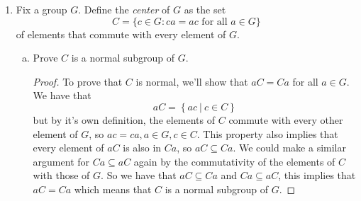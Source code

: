 \documentclass{article}
\newcommand{\parens}[1]{\left(#1\right)}
\newcommand{\bracks}[1]{\left\{#1\right\}}
\begin{document}
\begin{enumerate}[(H1)]
\begin{proof}
To prove that $A_n$ is a normal subgroup, we'll use the test for
normality. The test for normality is 
$$A_n \text{ is normal if and only if }\tau A_n\tau^{-1} \subseteq 
A_n,\ \forall \tau \in S_n$$
To show that $\tau A_n\tau^{-1} \subseteq A_n$, we need only show 
that all permutations in $\tau A_n\tau^{-1}$ are even.
We know that 
for all $\tau \in S_n$ there exists $\tau^{-1} \in S_n$ such that
$$\tau\tau^{-1} = \tau^{-1}\tau = e$$
where $e$ is the identity element of $S_n$. The identity is an even
permutation in $S_n$ so this implies that the parities of $\tau$ and 
$\tau^{-1}$ are identical, because otherwise their composition would
result in an odd permutation. By it's own definition 
$$\tau A_n\tau^{-1} = \bracks{\tau a\tau^{-1}\ \big|\ a\in A_n}$$
and as all permutations in $A_n$ are even, we need only consider the
parity of $\tau$.
If $\tau$ is even, 
$\tau a\tau^{-1}$ must also be even because every element would be
the composition of three even permutations. 
If $\tau$ is odd, we have the
same result because $\parens{\tau a}\tau^{-1} = \tau\parens{a
\tau^{-1}}$ so regardless of which composition is done first, we'll 
have an odd permutation composed with an odd permutation, which will 
be even.\\\\As every permutation in $\tau A_n\tau^{-1}$ is even, we 
have that $\tau A_n\tau^{-1} \subseteq A_n$ and so $A_n$ is a normal
subgroup. 
\end{proof}


\item 
Fix a group $G$.  Define the \emph{center} of $G$ as the set
$$C = \{c \in G : ca = ac \text{ for all } a \in G\}$$
of elements that commute with every element of $G$.  

\begin{enumerate}[(a)]
\item 
Prove $C$ is a normal subgroup of $G$.  

\begin{proof}
To prove that $C$ is normal, we'll show that $aC = Ca$ for all 
$a \in G$. We have that 
$$aC = \bracks{ac\ \big|\ c \in C}$$
but by it's own definition, the elements of $C$ commute with every 
other element of $G$, so $ac = ca, a\in G, c \in C$. This property 
also implies that every element of $aC$ is also in $Ca$, so 
$aC \subseteq Ca$. We could make a similar argument for $Ca 
\subseteq aC$ again by the commutativity of the elements of $C$ with
those of $G$. So we have that $aC \subseteq Ca$ and $Ca 
\subseteq aC$, this implies that $aC = Ca$ which means that $C$ is 
a normal subgroup of $G$.
\end{proof}



\end{enumerate}
\end{enumerate}
\end{document}
